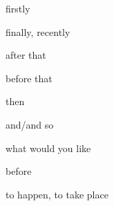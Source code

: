 \documentclass[avery5371,grid,frame]{flashcards}
\begin{document}
\begin{flashcard}{\LARGE firstly}
\LARGE {}
\end{flashcard}
\begin{flashcard}{\LARGE finally, recently}
\LARGE {}
\end{flashcard}
\begin{flashcard}{\LARGE after that}
\LARGE {}
\end{flashcard}
\begin{flashcard}{\LARGE before that}
\LARGE {}
\end{flashcard}
\begin{flashcard}{\LARGE then}
\LARGE {}
\end{flashcard}
\begin{flashcard}{\LARGE and/and so}
\LARGE {}
\end{flashcard}
\begin{flashcard}{\LARGE what would you like}
\LARGE {}
\end{flashcard}
\begin{flashcard}{\LARGE before}
\LARGE {}
\end{flashcard}
\begin{flashcard}{\LARGE to happen, to take place}
\LARGE {}
\end{flashcard}
\end{document}
